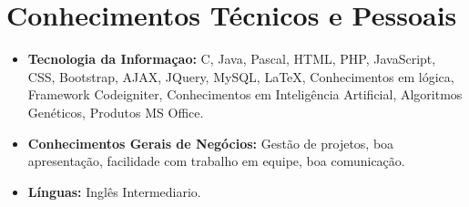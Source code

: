 \documentclass[11pt,a4paper,sans]{moderncv}        %
\begin{document}
\section{Conhecimentos Técnicos e Pessoais}

\vspace{6pt}

\begin{itemize}

\item \textbf{Tecnologia da Informaçao:} C, Java, Pascal, HTML, PHP, JavaScript, CSS, Bootstrap, AJAX, JQuery, MySQL, LaTeX, Conhecimentos em lógica, Framework Codeigniter, Conhecimentos em Inteligência Artificial, Algoritmos Genéticos, Produtos MS Office.

\vspace{6pt}







\item \textbf{Conhecimentos Gerais de Negócios:} Gestão de projetos, boa apresentação, facilidade com trabalho em equipe, boa comunicação.

\vspace{6pt}

\item \textbf{Línguas:} Inglês Intermediario.



\end{itemize}
\end{document}
